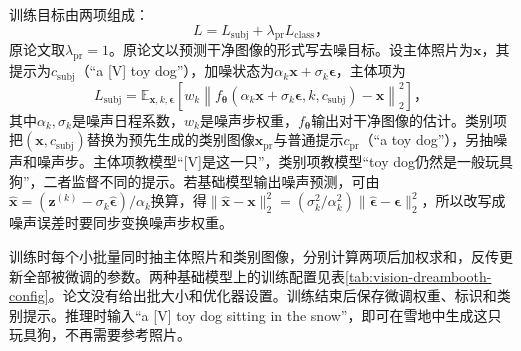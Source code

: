 训练目标由两项组成：
\begin{equation}
 L=L_{\mathrm{subj}}+\lambda_{\mathrm{pr}}L_{\mathrm{class}}\text{，}
 \label{eq:vision-dreambooth}
\end{equation}
原论文取$\lambda_{\mathrm{pr}}=1$。原论文以预测干净图像的形式写去噪目标。设主体照片为$\bm{x}$，其提示为$c_{\mathrm{subj}}$（“a [V] toy dog”），加噪状态为$\alpha_k\bm{x}+\sigma_k\bm{\epsilon}$，主体项为
\begin{equation}
 L_{\mathrm{subj}}=
 \mathbb{E}_{\bm{x},k,\bm{\epsilon}}
 \left[
 w_k\left\lVert
 f_{\bm{\theta}}(\alpha_k\bm{x}+\sigma_k\bm{\epsilon},
                  k,c_{\mathrm{subj}})-\bm{x}
 \right\rVert_2^2\right]\text{，}
 \label{eq:vision-dreambooth-subject}
\end{equation}
其中$\alpha_k,\sigma_k$是噪声日程系数，$w_k$是噪声步权重，$f_{\bm{\theta}}$输出对干净图像的估计。类别项把$(\bm{x},c_{\mathrm{subj}})$替换为预先生成的类别图像$\bm{x}_{\mathrm{pr}}$与普通提示$c_{\mathrm{pr}}$（“a toy dog”），另抽噪声和噪声步。主体项教模型“[V]是这一只”，类别项教模型“toy dog仍然是一般玩具狗”，二者监督不同的提示。若基础模型输出噪声预测，可由$\hat{\bm{x}}=(\bm{z}^{(k)}-\sigma_k\hat{\bm{\epsilon}})/\alpha_k$换算，得$\lVert\hat{\bm{x}}-\bm{x}\rVert_2^2=(\sigma_k^2/\alpha_k^2)\lVert\hat{\bm{\epsilon}}-\bm{\epsilon}\rVert_2^2$，所以改写成噪声误差时要同步变换噪声步权重。

训练时每个小批量同时抽主体照片和类别图像，分别计算两项后加权求和，反传更新全部被微调的参数。两种基础模型上的训练配置见表\ref{tab:vision-dreambooth-config}。论文没有给出批大小和优化器设置。训练结束后保存微调权重、标识和类别提示。推理时输入“a [V] toy dog sitting in the snow”，即可在雪地中生成这只玩具狗，不再需要参考照片。


